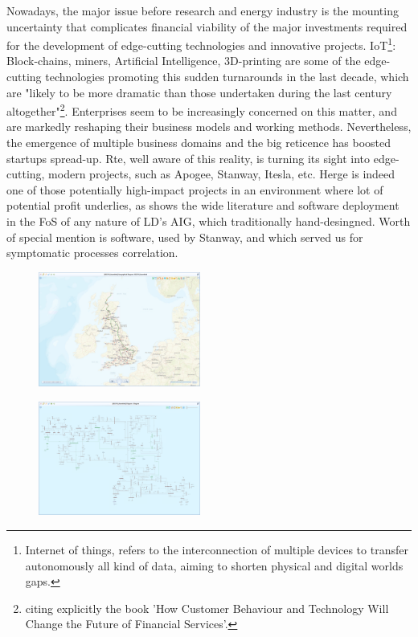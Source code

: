 Nowadays, the major issue before research and energy industry is the mounting uncertainty that complicates financial viability of the major investments required for the development of edge-cutting technologies and innovative projects. IoT\footnote{Internet of things, refers to the interconnection of multiple devices to transfer autonomously all kind of data, aiming to shorten physical and digital worlds gaps.}: Block-chains, miners, Artificial Intelligence, 3D-printing are some of the edge-cutting technologies promoting this sudden turnarounds in the last decade, which are "likely to be more dramatic than those undertaken during the last century altogether"\footnote{citing explicitly the book 'How Customer Behaviour and Technology Will Change the Future of Financial Services'.}. Enterprises seem to be increasingly concerned on this matter, and are markedly reshaping their business models and working methods. Nevertheless, the emergence of multiple business domains and the big reticence has boosted startups spread-up.   
Rte, well aware of this reality, is turning its sight into edge-cutting, modern projects, such as Apogee, Stanway, Itesla, etc. Herge is indeed one of those potentially high-impact projects in an environment where lot of potential profit underlies, as shows the wide literature and software deployment in the FoS of any nature of LD's AIG, which traditionally hand-desingned. Worth of special mention is  software, used by Stanway, and which served us for symptomatic processes correlation. 

\begin{figure}[ht]
    \centering
    \parbox[t]{0.475\textwidth}{
    \centering
    {\includegraphics[width=0.475\textwidth]{0.figuras/CIMdesk_england_chart.png}}
    \label{fig:CIMDesk}
    }
    \hfill
    \parbox[t]{0.475\textwidth}{
    \centering
    {\includegraphics[width=0.475\textwidth]{0.figuras/CIMdesk_england_network_electrical_chart.png}}
    \label{fig:CIMDeskdiagram}
    }
\end{figure}

